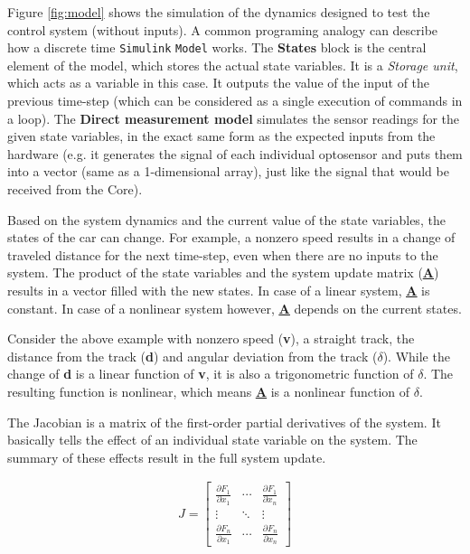 Figure \ref{fig:model} shows the simulation of the dynamics designed to test the control system (without inputs). A common programing analogy can describe how a discrete time \verb!Simulink! \verb!Model! works. The \textbf{States} block is the central element of the model, which stores the actual state variables. It is a \emph{Storage unit}, which acts as a variable in this case. It outputs the value of the input of the previous time-step (which can be considered as a single execution of commands in a loop). The \textbf{Direct measurement model} simulates the sensor readings for the given state variables, in the exact same form as the expected inputs from the hardware (e.g. it generates the signal of each individual optosensor and puts them into a vector (same as a 1-dimensional array), just like the signal that would be received from the Core).

Based on the system dynamics and the current value of the state variables, the states of the car can change. For example, a nonzero speed results in a change of traveled distance for the next time-step, even when there are no inputs to the system. The product of the state variables and the system update matrix (\textbf{\underline{\underline{A}}}) results in a vector filled with the new states. In case of a linear system, \textbf{\underline{\underline{A}}} is constant. In case of a nonlinear system however, \textbf{\underline{\underline{A}}} depends on the current states. 

Consider the above example with nonzero speed (\textbf{v}), a straight track, the distance from the track (\textbf{d}) and angular deviation from the track ($\delta$). While the change of \textbf{d} is a linear function of \textbf{v}, it is also a trigonometric function of $\delta$. The resulting function is nonlinear, which means \textbf{\underline{\underline{A}}} is a nonlinear function of $\delta$. 

The Jacobian is a matrix of the first-order partial derivatives of the system\cite{jacobian}. It basically tells the effect of an individual state variable on the system. The summary of these effects result in the full system update.

\begin{align}
J =
 \begin{bmatrix}
  \frac{\partial F_1}{\partial x_1} & \cdots & \frac{\partial F_1}{\partial x_n} \\
  \vdots  & \ddots & \vdots  \\
  \frac{\partial F_n}{\partial x_1} & \cdots & \frac{\partial F_n}{\partial x_n}
 \end{bmatrix}
\end{align}

